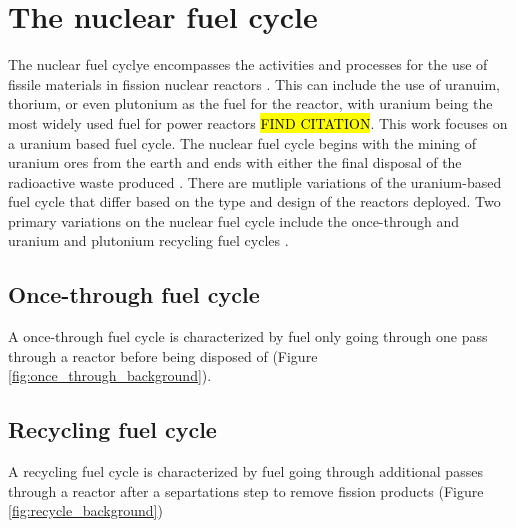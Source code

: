 \section{The nuclear fuel cycle}
The nuclear fuel cyclye encompasses the activities and processes 
for the use of fissile materials in fission nuclear reactors \cite{tsoulfanidis_nuclear_2013}. 
This can include the use of uranuim, thorium, or even plutonium as the 
fuel for the reactor, with uranium being the most widely used fuel for 
power reactors \hl{FIND CITATION}. This work focuses on a uranium based 
fuel cycle. The nuclear fuel cycle begins with the mining of uranium ores from the earth 
and ends with either the final disposal of the radioactive waste produced 
\cite{tsoulfanidis_nuclear_2013}. There are mutliple variations of 
the uranium-based fuel cycle that differ based on the type and design of 
the reactors deployed. Two primary variations on the nuclear fuel cycle 
include the once-through and uranium and plutonium recycling fuel cycles 
\cite{tsoulfanidis_nuclear_2013}.

\subsection{Once-through fuel cycle}
A once-through fuel cycle is characterized by fuel only going through one 
pass through a reactor before being disposed of (Figure \ref{fig:once_through_background}).


\subsection{Recycling fuel cycle}
A recycling fuel cycle is characterized by fuel going through additional 
passes through a reactor after a separtations step to remove fission 
products (Figure \ref{fig:recycle_background})


